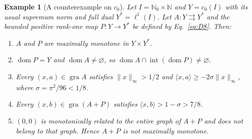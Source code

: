 \documentclass[11pt]{article}
\newcommand{\N}{\mathbb N}
\newcommand{\Nzero}{\mathbb N_0}
\newcommand{\gra}{\operatorname{gra}}
\newcommand{\dom}{\operatorname{dom}}
\newcommand{\pair}[2]{\langle #1,#2\rangle}
\newtheorem{example}{Example}
\theoremstyle{definition}
\theoremstyle{remark}
\begin{document}
\label{sec:c0}
\label{sec:statements}
\begin{example}[A counterexample on $c_0$]\label{thm:C}
Let $I=\Nzero\times\N$ and $Y=c_0(I)$ with its usual supremum norm and
full dual $Y^*=\ell^1(I)$. Let $A:Y\rightrightarrows Y^*$ and the bounded
positive rank-one map $P:Y\to Y^*$ be defined by Eq.~\eqref{eq:D8}.
Then:
\begin{enumerate}
\item $A$ and $P$ are maximally monotone in $Y\times Y^*$.
\item $\dom P=Y$ and $\dom A\ne\varnothing$, so
$\dom A\cap\operatorname{int}(\dom P)\ne\varnothing$.
\item Every $(x,a)\in\gra A$ satisfies $\|x\|_\infty>1/2$ and
$\pair{x}{a}\ge-2\sigma\|x\|_\infty$, where $\sigma=\pi^2/96<1/8$.
\item Every $(x,b)\in\gra(A+P)$ satisfies
$\pair{x}{b}>1-\sigma>7/8$.
\item $(0,0)$ is monotonically related to the entire graph of $A+P$ and
does not belong to that graph. Hence $A+P$ is not maximally monotone.
\end{enumerate}
\end{example}
\end{document}
